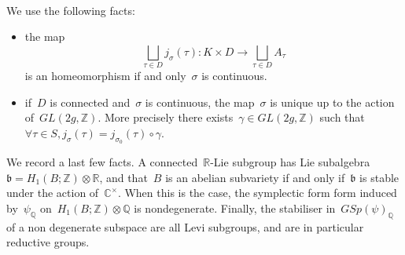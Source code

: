 \documentclass[12pt]{amsart}
\newcommand{\R}{{\mathbb R}}
\newcommand{\Z}{{\mathbb Z}}
\newcommand{\Q}{{\mathbb Q}}
\newcommand{\C}{{\mathbb C}}
\newcommand{\tens}{\otimes}
\begin{document}
\paragraph{}\label{para:facts}

We use the following facts:
\begin{itemize}
\item the map 
\[
\bigsqcup_{\tau \in D} j_\sigma(\tau):K\times D\to \bigsqcup_{\tau \in D} A_\tau
\]
is an homeomorphism if and only~$\sigma$ is continuous.
\item if~$D$ is connected and~$\sigma$ is continuous, the map~$\sigma$ is unique up to the action of~$GL(2g,\Z)$. More precisely there exists~$\gamma\in GL(2g,\Z)$ such that~$\forall \tau\in S, j_\sigma(\tau)=j_{\sigma_0}(\tau)\circ\gamma$.
\end{itemize}

We record a last few facts. A connected~$\R$-Lie subgroup has Lie subalgebra~$\mathfrak{b}=H_1(B;\Z)\tens\R$, and that~$B$ is an abelian subvariety if and only if~$\mathfrak{b}$ is stable under the action of~$\C^\times$. When this is the case, the symplectic form form induced by~$\psi_\Q$ on~$H_1(B;\Z)\tens\Q$ is  nondegenerate. Finally, the stabiliser in~$GSp(\psi)_\Q$ of a non degenerate subspace are all Levi subgroups, and are in particular reductive groups. 

\subsubsection{}
\end{document}

